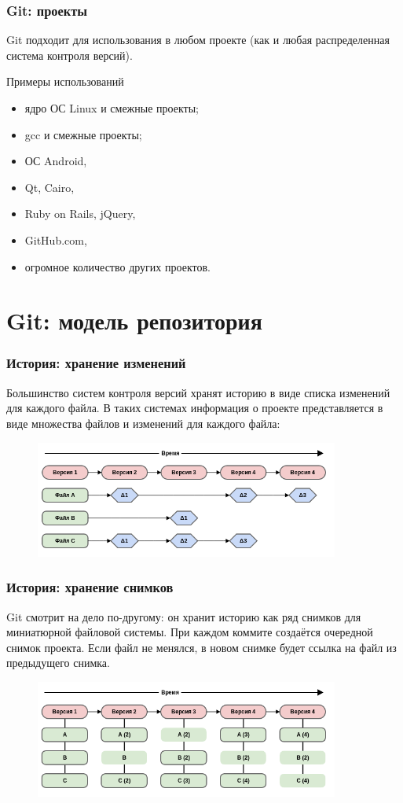 \documentclass{beamer}
\begin{document}
\begin{frame}
  \frametitle{Git: проекты}
  Git подходит для использования в любом проекте (как и любая
  распределенная система контроля версий).

  \begin{block}{Примеры использований}
    \begin{itemize}
      \item ядро ОС Linux и смежные проекты;
      \item gcc и смежные проекты;
      \item ОС Android,
      \item Qt, Cairo,
      \item Ruby on Rails, jQuery,
      \item GitHub.com,
      \item огромное количество других проектов.
    \end{itemize}
  \end{block}
\end{frame}

\section{Git: модель репозитория}

\begin{frame}
  \frametitle{История: хранение изменений}
  Большинство систем контроля версий хранят историю в виде списка
  изменений для каждого файла. В таких системах информация о проекте
  представляется в виде множества файлов и изменений для каждого файла:

  \begin{figure}
     \includegraphics[width=10cm]{images/history-deltas.png}
  \end{figure}
\end{frame}

\begin{frame}
  \frametitle{История: хранение снимков}
  Git смотрит на дело по-другому: он хранит историю как ряд снимков для
  миниатюрной файловой системы. При каждом коммите создаётся очередной снимок
  проекта. Если файл не менялся, в новом снимке будет ссылка на файл из предыдущего
  снимка.

  \begin{figure}
     \includegraphics[width=10cm]{images/history-snapshots.png}
  \end{figure}
\end{frame}
\end{document}
